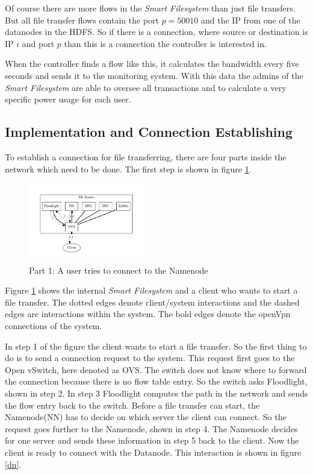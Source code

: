  Of course there are more flows in the \textit{Smart Filesystem} than just file transfers. But all file transfer flows contain the port $p=50010$ and the IP from one of the datanodes in the HDFS. So if there is a connection, where source or destination is IP $i$ and port $p$ than this is a connection the controller is interested in.
 
 When the controller finds a flow like this, it calculates the bandwidth every five seconds and sends it to the monitoring system. With this data the admins of the \textit{Smart Filesystem} are able to oversee all transactions and to calculate a very specific power usage for each user. 
 
 \subsection{Implementation and Connection Establishing}               

To establish a connection for file transferring, there are four parts inside the network which need to be done. The first step is shown in figure \ref{nn}.
 
\begin{figure}[htp]
\centering
\includegraphics[width=0.45\textwidth]{img/connectionToNamenode} 
\caption{Part 1: A user tries to connect to the Namenode}
\label{nn}
\end{figure}

Figure \ref{nn} shows the internal \textit{Smart Filesystem} and a client who wants to start a file transfer. The dotted edges denote client/system interactions and the dashed edges are interactions within the system. The bold edges denote the openVpn connections of the system.

In step 1 of the figure the client wants to start a file transfer. So the first thing to do is to send a connection request to the system. This request first goes to the Open vSwitch, here denoted as OVS. The switch does not know where to forward the connection because there is no flow table entry. So the switch asks Floodlight, shown in step 2. In step 3 Floodlight computes the path in the network and sends the flow entry back to the switch. Before a file transfer can start, the Namenode(NN) has to decide on which server the client can connect. So the request goes further to the Namenode, shown in step 4. The Namenode decides for one server and sends these information in step 5 back to the client. Now the client is ready to connect with the Datanode. This interaction is shown in figure \ref{dn}.

